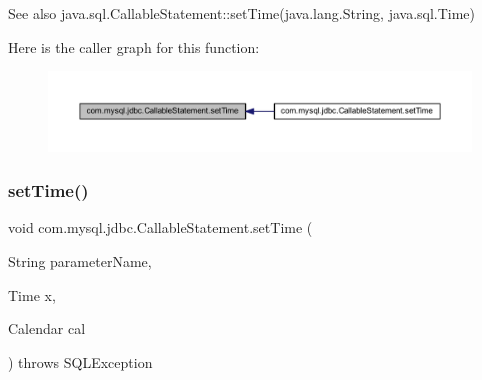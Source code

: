\begin{DoxySeeAlso}{See also}
java.\+sql.\+Callable\+Statement\+::set\+Time(java.\+lang.\+String, java.\+sql.\+Time) 
\end{DoxySeeAlso}
Here is the caller graph for this function\+:\nopagebreak
\begin{figure}[H]
\begin{center}
\leavevmode
\includegraphics[width=350pt]{classcom_1_1mysql_1_1jdbc_1_1_callable_statement_a3a17ab41bb2d2edd46042dc05aadda4d_icgraph}
\end{center}
\end{figure}
\mbox{\label{classcom_1_1mysql_1_1jdbc_1_1_callable_statement_a9295718be5a4fc486123ab0254a4b18e}} 
\subsubsection{\texorpdfstring{set\+Time()}{setTime()}\hspace{0.1cm}{\footnotesize\ttfamily [2/2]}}
{\footnotesize\ttfamily void com.\+mysql.\+jdbc.\+Callable\+Statement.\+set\+Time (\begin{DoxyParamCaption}\item[{String}]{parameter\+Name,  }\item[{Time}]{x,  }\item[{Calendar}]{cal }\end{DoxyParamCaption}) throws S\+Q\+L\+Exception}

